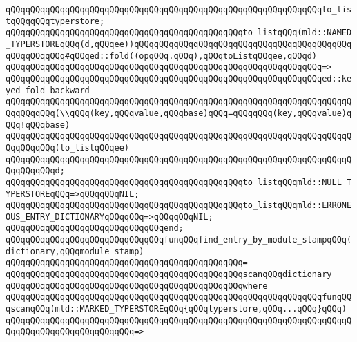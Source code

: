 \verb|qQQqqQQqqQQqqQQqqQQqqQQqqQQqqQQqqQQqqQQqqQQqqQQqqQQqqQQqqQQqqQQqto_listqQQqqQQqtyperstore;|\newline
\newline
\verb|qQQqqQQqqQQqqQQqqQQqqQQqqQQqqQQqqQQqqQQqqQQqqQQqto_listqQQq(mld::NAMED_TYPERSTOREqQQq(d,qQQqee))qQQqqQQqqQQqqQQqqQQqqQQqqQQqqQQqqQQqqQQqqQQqqQQqqQQqqQQq#qQQqed::fold((opqQQq.qQQq),qQQqtoListqQQqee,qQQqd)|\newline
\verb|qQQqqQQqqQQqqQQqqQQqqQQqqQQqqQQqqQQqqQQqqQQqqQQqqQQqqQQqqQQqqQQq=>|\newline
\verb|qQQqqQQqqQQqqQQqqQQqqQQqqQQqqQQqqQQqqQQqqQQqqQQqqQQqqQQqqQQqqQQqed::keyed_fold_backward|\newline
\verb|qQQqqQQqqQQqqQQqqQQqqQQqqQQqqQQqqQQqqQQqqQQqqQQqqQQqqQQqqQQqqQQqqQQqqQQqqQQqqQQq(\\qQQq(key,qQQqvalue,qQQqbase)qQQq=qQQqqQQq(key,qQQqvalue)qQQq!qQQqbase)|\newline
\verb|qQQqqQQqqQQqqQQqqQQqqQQqqQQqqQQqqQQqqQQqqQQqqQQqqQQqqQQqqQQqqQQqqQQqqQQqqQQqqQQq(to_listqQQqee)|\newline
\verb|qQQqqQQqqQQqqQQqqQQqqQQqqQQqqQQqqQQqqQQqqQQqqQQqqQQqqQQqqQQqqQQqqQQqqQQqqQQqqQQqd;|\newline
\newline
\verb|qQQqqQQqqQQqqQQqqQQqqQQqqQQqqQQqqQQqqQQqqQQqqQQqto_listqQQqmld::NULL_TYPERSTOREqQQq=>qQQqqQQqNIL;|\newline
\verb|qQQqqQQqqQQqqQQqqQQqqQQqqQQqqQQqqQQqqQQqqQQqqQQqto_listqQQqmld::ERRONEOUS_ENTRY_DICTIONARYqQQqqQQq=>qQQqqQQqNIL;|\newline
\verb|qQQqqQQqqQQqqQQqqQQqqQQqqQQqqQQqend;|\newline
\newline
\verb|qQQqqQQqqQQqqQQqqQQqqQQqqQQqqQQqfunqQQqfind_entry_by_module_stampqQQq(dictionary,qQQqmodule_stamp)|\newline
\verb|qQQqqQQqqQQqqQQqqQQqqQQqqQQqqQQqqQQqqQQqqQQqqQQq=|\newline
\verb|qQQqqQQqqQQqqQQqqQQqqQQqqQQqqQQqqQQqqQQqqQQqqQQqscanqQQqdictionary|\newline
\verb|qQQqqQQqqQQqqQQqqQQqqQQqqQQqqQQqqQQqqQQqqQQqqQQqwhere|\newline
\verb|qQQqqQQqqQQqqQQqqQQqqQQqqQQqqQQqqQQqqQQqqQQqqQQqqQQqqQQqqQQqqQQqfunqQQqscanqQQq(mld::MARKED_TYPERSTOREqQQq{qQQqtyperstore,qQQq...qQQq}qQQq)|\newline
\verb|qQQqqQQqqQQqqQQqqQQqqQQqqQQqqQQqqQQqqQQqqQQqqQQqqQQqqQQqqQQqqQQqqQQqqQQqqQQqqQQqqQQqqQQqqQQqqQQq=>|\newline
